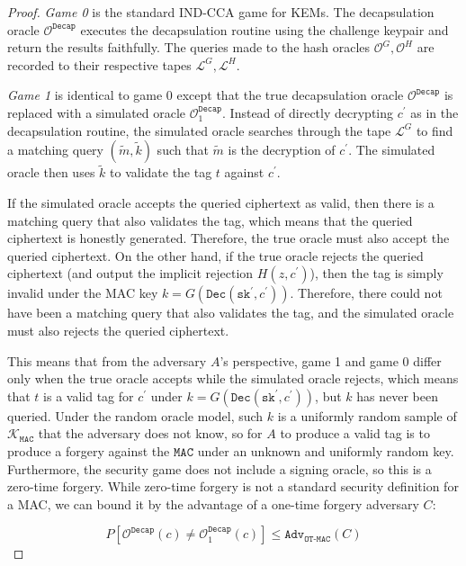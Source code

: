 \documentclass[journal=tches,submission]{iacrtrans}
\newcommand{\decrypt}{\texttt{Dec}}
\newcommand{\decap}{\texttt{Decap}}
\newcommand{\mac}{\texttt{MAC}}
\newcommand{\sk}{\texttt{sk}}
\newcommand{\adv}{\texttt{Adv}}
\begin{document}
\begin{proof}
    \emph{Game 0} is the standard IND-CCA game for KEMs. The decapsulation oracle $\mathcal{O}^\decap$ executes the decapsulation routine using the challenge keypair and return the results faithfully. The queries made to the hash oracles $\mathcal{O}^G, \mathcal{O}^H$ are recorded to their respective tapes $\mathcal{L}^G, \mathcal{L}^H$.

    \emph{Game 1} is identical to game 0 except that the true decapsulation oracle $\mathcal{O}^\decap$ is replaced with a simulated oracle $\mathcal{O}^\decap_1$. Instead of directly decrypting $c^\prime$ as in the decapsulation routine, the simulated oracle searches through the tape $\mathcal{L}^G$ to find a matching query $(\tilde{m}, \tilde{k})$ such that $\tilde{m}$ is the decryption of $c^\prime$. The simulated oracle then uses $\tilde{k}$ to validate the tag $t$ against $c^\prime$.

    If the simulated oracle accepts the queried ciphertext as valid, then there is a matching query that also validates the tag, which means that the queried ciphertext is honestly generated. Therefore, the true oracle must also accept the queried ciphertext. On the other hand, if the true oracle rejects the queried ciphertext (and output the implicit rejection $H(z, c^\prime)$), then the tag is simply invalid under the MAC key $k = G(\decrypt(\sk^\prime, c^\prime))$. Therefore, there could not have been a matching query that also validates the tag, and the simulated oracle must also rejects the queried ciphertext.

    This means that from the adversary $A$'s perspective, game 1 and game 0 differ only when the true oracle accepts while the simulated oracle rejects, which means that $t$ is a valid tag for $c^\prime$ under $k = G(\decrypt(\sk^\prime, c^\prime))$, but $k$ has never been queried. Under the random oracle model, such $k$ is a uniformly random sample of $\mathcal{K}_\mac$ that the adversary does not know, so for $A$ to produce a valid tag is to produce a forgery against the $\mac$ under an unknown and uniformly random key. Furthermore, the security game does not include a signing oracle, so this is a zero-time forgery. While zero-time forgery is not a standard security definition for a MAC, we can bound it by the advantage of a one-time forgery adversary $C$:

    \begin{equation*}
        P\left[\mathcal{O}^\decap(c) \neq \mathcal{O}^\decap_1(c)\right]
        \leq \adv_\texttt{OT-MAC}(C)
    \end{equation*}


\end{proof}
\end{document}
